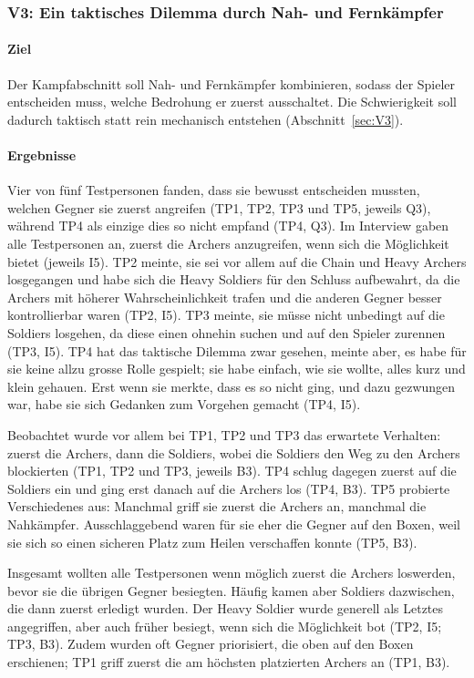 \documentclass[../Main.tex]{subfiles}
\begin{document}
\subsubsection{V3: Ein taktisches Dilemma durch Nah- und Fernkämpfer}

\paragraph{Ziel}
Der Kampfabschnitt soll Nah- und Fernkämpfer kombinieren, sodass der Spieler entscheiden muss, welche Bedrohung er zuerst ausschaltet. Die Schwierigkeit soll dadurch taktisch statt rein mechanisch entstehen (Abschnitt~\ref{sec:V3}).

\paragraph{Ergebnisse}
Vier von fünf Testpersonen fanden, dass sie bewusst entscheiden mussten, welchen Gegner sie zuerst angreifen (TP1, TP2, TP3 und TP5, jeweils Q3), während TP4 als einzige dies so nicht empfand (TP4, Q3). Im Interview gaben alle Testpersonen an, zuerst die Archers anzugreifen, wenn sich die Möglichkeit bietet (jeweils I5). TP2 meinte, sie sei vor allem auf die Chain und Heavy Archers losgegangen und habe sich die Heavy Soldiers für den Schluss aufbewahrt, da die Archers mit höherer Wahrscheinlichkeit trafen und die anderen Gegner besser kontrollierbar waren (TP2, I5). TP3 meinte, sie müsse nicht unbedingt auf die Soldiers losgehen, da diese einen ohnehin suchen und auf den Spieler zurennen (TP3, I5). TP4 hat das taktische Dilemma zwar gesehen, meinte aber, es habe für sie keine allzu grosse Rolle gespielt; sie habe einfach, wie sie wollte, alles kurz und klein gehauen. Erst wenn sie merkte, dass es so nicht ging, und dazu gezwungen war, habe sie sich Gedanken zum Vorgehen gemacht (TP4, I5).

Beobachtet wurde vor allem bei TP1, TP2 und TP3 das erwartete Verhalten: zuerst die Archers, dann die Soldiers, wobei die Soldiers den Weg zu den Archers blockierten (TP1, TP2 und TP3, jeweils B3). TP4 schlug dagegen zuerst auf die Soldiers ein und ging erst danach auf die Archers los (TP4, B3). TP5 probierte Verschiedenes aus: Manchmal griff sie zuerst die Archers an, manchmal die Nahkämpfer. Ausschlaggebend waren für sie eher die Gegner auf den Boxen, weil sie sich so einen sicheren Platz zum Heilen verschaffen konnte (TP5, B3).

Insgesamt wollten alle Testpersonen wenn möglich zuerst die Archers loswerden, bevor sie die übrigen Gegner besiegten. Häufig kamen aber Soldiers dazwischen, die dann zuerst erledigt wurden. Der Heavy Soldier wurde generell als Letztes angegriffen, aber auch früher besiegt, wenn sich die Möglichkeit bot (TP2, I5; TP3, B3). Zudem wurden oft Gegner priorisiert, die oben auf den Boxen erschienen; TP1 griff zuerst die am höchsten platzierten Archers an (TP1, B3).
\end{document}
